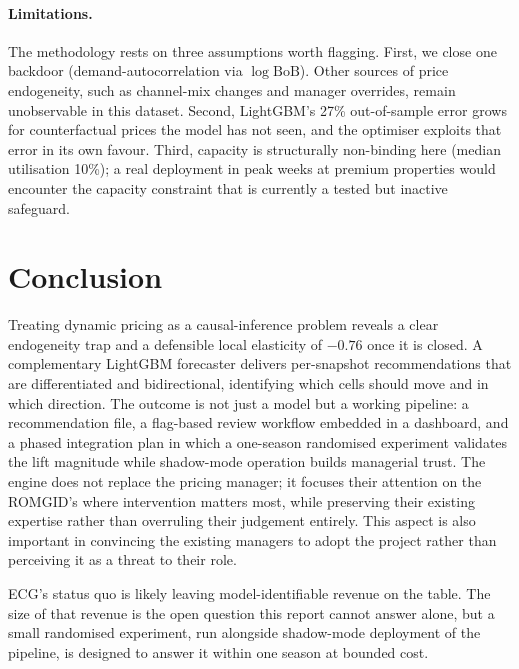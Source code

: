 \documentclass[11pt,a4paper]{article}
\begin{document}
\paragraph{Limitations.} The methodology rests on three assumptions worth flagging. First, we close one backdoor (demand-autocorrelation via $\log\mathrm{BoB}$). Other sources of price endogeneity, such as channel-mix changes and manager overrides, remain unobservable in this dataset. Second, LightGBM's 27\% out-of-sample error grows for counterfactual prices the model has not seen, and the optimiser exploits that error in its own favour. Third, capacity is structurally non-binding here (median utilisation 10\%); a real deployment in peak weeks at premium properties would encounter the capacity constraint that is currently a tested but inactive safeguard.

\section{Conclusion}

Treating dynamic pricing as a causal-inference problem reveals a clear endogeneity trap and a defensible local elasticity of $-0.76$ once it is closed. A complementary LightGBM forecaster delivers per-snapshot recommendations that are differentiated and bidirectional, identifying which cells should move and in which direction. The outcome is not just a model but a working pipeline: a recommendation file, a flag-based review workflow embedded in a dashboard, and a phased integration plan in which a one-season randomised experiment validates the lift magnitude while shadow-mode operation builds managerial trust. The engine does not replace the pricing manager; it focuses their attention on the ROMGID's where intervention matters most, while preserving their existing expertise rather than overruling their judgement entirely. This aspect is also important in convincing the existing managers to adopt the project rather than perceiving it as a threat to their role.

ECG's status quo is likely leaving model-identifiable revenue on the table. The size of that revenue is the open question this report cannot answer alone, but a small randomised experiment, run alongside shadow-mode deployment of the pipeline, is designed to answer it within one season at bounded cost.
\end{document}
